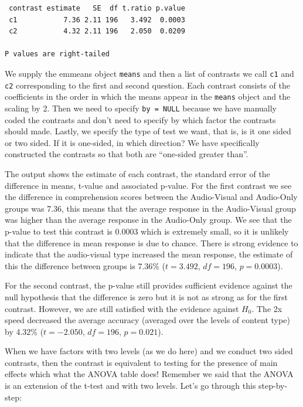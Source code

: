\documentclass[
  letterpaper,
]{book}
\begin{document}
\begin{verbatim}
 contrast estimate   SE  df t.ratio p.value
 c1           7.36 2.11 196   3.492  0.0003
 c2           4.32 2.11 196   2.050  0.0209

P values are right-tailed 
\end{verbatim}

We supply the emmeans object \texttt{means} and then a list of contrasts
we call \texttt{c1} and \texttt{c2} corresponding to the first and
second question. Each contrast consists of the coefficients in the order
in which the means appear in the \texttt{means} object and the scaling
by 2. Then we need to specify \texttt{by\ =\ NULL} because we have
manually coded the contrasts and don't need to specify by which factor
the contrasts should made. Lastly, we specify the type of test we want,
that is, is it one sided or two sided. If it is one-sided, in which
direction? We have specifically constructed the contrasts so that both
are ``one-sided greater than''.

The output shows the estimate of each contrast, the standard error of
the difference in means, t-value and associated p-value. For the first
contrast we see the difference in comprehension scores between the
Audio-Visual and Audio-Only groups was 7.36, this means that the average
response in the Audio-Visual group was higher than the average response
in the Audio-Only group. We see that the p-value to test this contrast
is 0.0003 which is extremely small, so it is unlikely that the
difference in mean response is due to chance. There is strong evidence
to indicate that the audio-visual type increased the mean response, the
estimate of this the difference between groups is 7.36\% (\(t=3.492\),
\(df = 196\), \(p = 0.0003\)).

For the second contrast, the p-value still provides sufficient evidence
against the null hypothesis that the difference is zero but it is not as
strong as for the first contrast. However, we are still satisfied with
the evidence against \(H_0\). The 2x speed decreased the average
accuracy (averaged over the levels of content type) by 4.32\%
(\(t=-2.050\), \(df = 196\), \(p = 0.021\)).

When we have factors with two levels (as we do here) and we conduct two
sided contrasts, then the contrast is equivalent to testing for the
presence of main effects which what the ANOVA table does! Remember we
said that the ANOVA is an extension of the t-test and with two levels.
Let's go through this step-by-step:
\end{document}
